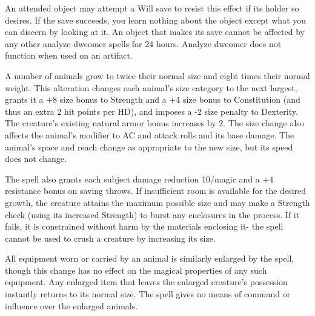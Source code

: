 \begin{multicols}{2}
\begin{small}
\smallskip\noindent An attended object may attempt a Will save to resist this effect if its holder so desires. If the save succeeds, you learn nothing about the object except what you can discern by looking at it. An object that makes its save cannot be affected by any other analyze dweomer spells for 24 hours.
Analyze dweomer does not function when used on an artifact.


\noindent A number of animals grow to twice their normal size and eight times their normal weight. This alteration changes each animal's size category to the next largest, grants it a +8 size bonus to Strength and a +4 size bonus to Constitution (and thus an extra 2 hit points per HD), and imposes a -2 size penalty to Dexterity. The creature's existing natural armor bonus increases by 2. The size change also affects the animal's modifier to AC and attack rolls and its base damage. The animal's space and reach change as appropriate to the new size, but its speed does not change.

\smallskip\noindent The spell also grants each subject damage reduction 10/magic and a +4 resistance bonus on saving throws. If insufficient room is available for the desired growth, the creature attains the maximum possible size and may make a Strength check (using its increased Strength) to burst any enclosures in the process. If it fails, it is constrained without harm by the materials enclosing it- the spell cannot be used to crush a creature by increasing its size.

\smallskip\noindent All equipment worn or carried by an animal is similarly enlarged by the spell, though this change has no effect on the magical properties of any such equipment.
Any enlarged item that leaves the enlarged creature's possession instantly returns to its normal size.
\smallskip\noindent 
The spell gives no means of command or influence over the enlarged animals.


\end{small}
\end{multicols}
